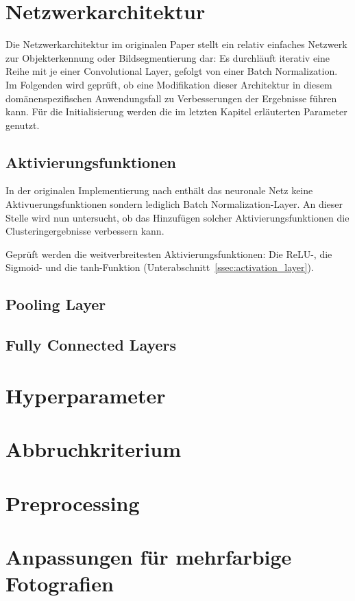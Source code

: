 \section{Netzwerkarchitektur}
\label{sec:network_architecture}

Die Netzwerkarchitektur im originalen Paper stellt ein relativ einfaches Netzwerk zur Objekterkennung oder Bildsegmentierung dar: Es durchläuft iterativ eine Reihe mit je einer Convolutional Layer, gefolgt von einer Batch Normalization. Im Folgenden wird geprüft, ob eine Modifikation dieser Architektur in diesem domänenspezifischen Anwendungsfall zu Verbesserungen der Ergebnisse führen kann. Für die Initialisierung werden die im letzten Kapitel erläuterten Parameter genutzt.

\subsection{Aktivierungsfunktionen}
\label{ssec:network_architecture_activation}

In der originalen Implementierung nach \cite{kanezaki_18} enthält das neuronale Netz keine Aktivuerungsfunktionen sondern lediglich Batch Normalization-Layer. An dieser Stelle wird nun untersucht, ob das Hinzufügen solcher Aktivierungsfunktionen die Clusteringergebnisse verbessern kann.

Geprüft werden die weitverbreitesten Aktivierungsfunktionen: Die ReLU-, die Sigmoid- und die tanh-Funktion (\vgl Unterabschnitt~\ref{ssec:activation_layer}).



\subsection{Pooling Layer}
\label{ssec:network_architecture_pooling}

\subsection{Fully Connected Layers}
\label{ssec:network_architecture_fully_connected}

\section{Hyperparameter}
\label{sec:hyperparameter}

\section{Abbruchkriterium}
\label{sec:stoppingcriteria}

\section{Preprocessing}
\label{sec:preprocessing}

\section{Anpassungen für mehrfarbige Fotografien}
\label{sec:color_picture_optimization}